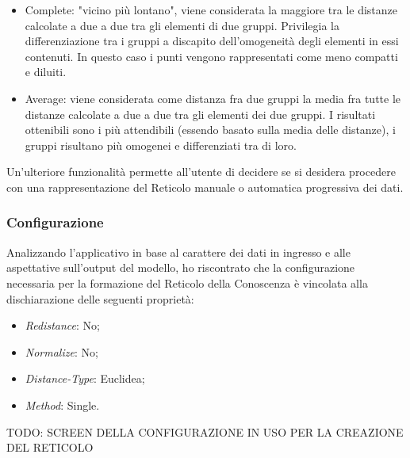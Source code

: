 \begin{itemize}
\begin{itemize}
\item Complete: "vicino pi\`u lontano", viene considerata la maggiore tra le distanze calcolate a due a due tra gli elementi di due gruppi. Privilegia la differenziazione tra i gruppi a discapito dell'omogeneit\`a degli elementi in essi contenuti. In questo caso i punti vengono rappresentati come meno compatti e diluiti.
\item Average: viene considerata come distanza fra due gruppi la media fra tutte le distanze calcolate a due a due tra gli elementi dei due gruppi. I risultati ottenibili sono i pi\`u attendibili (essendo basato sulla media delle distanze), i gruppi risultano pi\`u omogenei e differenziati tra di loro.
\end{itemize}
\end{itemize}
\noindent
Un'ulteriore funzionalit\`a permette all'utente di decidere se si desidera procedere con una rappresentazione del Reticolo manuale o automatica progressiva dei dati.

\subsubsection{Configurazione}
\label{configurazione}
Analizzando l'applicativo in base al carattere dei dati in ingresso e alle aspettative sull'output del modello, ho riscontrato che la configurazione necessaria per la formazione del Reticolo della Conoscenza \`e vincolata alla dischiarazione delle seguenti propriet\`a:
\begin{itemize}
\item \textit{Redistance}: No;
\item  \textit{Normalize}: No;
\item \textit{Distance-Type}: Euclidea;
\item \textit{Method}: Single.
\end{itemize}
\noindent
TODO: SCREEN DELLA CONFIGURAZIONE IN USO PER LA CREAZIONE DEL RETICOLO


